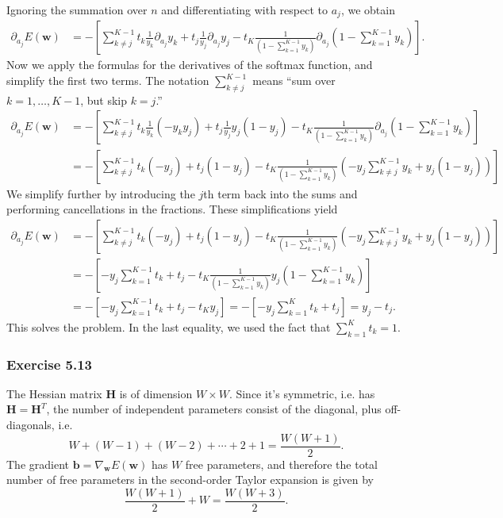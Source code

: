 \documentclass[12pt, a4paper]{article}
\newcommand{\vect}[1]{\bm{#1}}
\begin{document}
Ignoring the summation over $n$ and differentiating with respect to $a_j$, we obtain
\begin{align*}
\partial_{a_j} E(\vect{w})
&=
- \left[ 
\sum_{k \neq j}^{K-1} t_k \frac{1}{y_k} \partial_{a_j} y_k
+
t_j \frac{1}{y_j} \partial_{a_j} y_j
-
t_{K}
\frac{1}{\left( 1 - \sum_{k=1}^{K-1} y_{k} \right)}
\partial_{a_j} 
\left( 1 - \sum_{k=1}^{K-1} y_{k} \right)
\right].
\end{align*}
Now we apply the formulas for the derivatives of the softmax function, and simplify  the first two terms.
The notation $\sum_{k \neq j}^{K-1}$ means ``sum over $k=1, \ldots, K-1$, but skip $k=j$.''
\begin{align*}
\partial_{a_j} E(\vect{w})
	&=
	- \left[ 
	\sum_{k \neq j}^{K-1} t_k \frac{1}{y_k} (- y_k y_j)
	+
	t_j \frac{1}{y_j} y_j (1 - y_j)
	-
	t_{K}
	\frac{1}{\left( 1 - \sum_{k=1}^{K-1} y_{k} \right)}
	\partial_{a_j} 
	\left( 1 - \sum_{k=1}^{K-1} y_{k} \right)
	\right]
	\\
	&=
	- \left[ 
	\sum_{k \neq j}^{K-1} t_k  (- y_j)
	+
	t_j  (1 - y_j)
	-
	t_{K}
	\frac{1}{\left( 1 - \sum_{k=1}^{K-1} y_{k} \right)}
	\left( - y_j \sum_{k \neq j }^{K-1} y_{k} + y_j (1 - y_j) \right)
	\right]
\end{align*}
We simplify further by introducing the $j$th term back into the sums and performing cancellations in the fractions.
These simplifications yield
\begin{align*}
\partial_{a_j} E(\vect{w})
&=
- \left[ 
\sum_{k \neq j}^{K-1} t_k  (- y_j)
+
t_j  (1 - y_j)
-
t_{K}
\frac{1}{\left( 1 - \sum_{k=1}^{K-1} y_{k} \right)}
\left( - y_j \sum_{k \neq j }^{K-1} y_{k} + y_j (1 - y_j) \right)
\right]
\\
&=
- \left[ 
-y_j \sum_{k = 1}^{K-1} t_k  + t_j
-
t_{K}
\frac{1}{\left( 1 - \sum_{k=1}^{K-1} y_{k} \right)}
y_j \left( 1 - \sum_{k =1 }^{K-1} y_{k} \right)
\right] \\
&=
- \left[ 
-y_j \sum_{k = 1}^{K-1} t_k  + t_j
-
t_{K}
y_j
\right]
= - \left[ 
-y_j \sum_{k = 1}^{K} t_k  + t_j
\right]
= y_j - t_j.
\end{align*}
This solves the problem.
In the last equality, we used the fact that $\sum_{k=1}^{K} t_{k} = 1$.



\subsubsection*{Exercise 5.13}
The Hessian matrix $\vect{H}$ is of dimension  $W \times W$.
Since it's symmetric, i.e. has $\vect{H} = \vect{H}^T$, the number of independent parameters consist of the diagonal, plus off-diagonals, i.e.
\begin{equation*}
	W + (W - 1) + (W - 2) + \cdots + 2 + 1 = \frac{W (W+1)}{2}.
\end{equation*}
The gradient $\vect{b} = \nabla_{\vect{w}} E(\vect{w})$ has $W$ free parameters, and therefore the total number of free parameters in the second-order Taylor expansion is given by
\begin{equation*}
	\frac{W(W + 1)}{2} + W = \frac{W (W + 3)}{2}.
\end{equation*}
\end{document}
